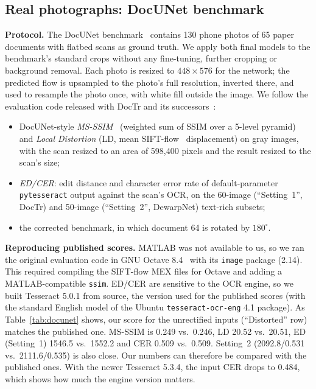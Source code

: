 \documentclass[a4paper,fleqn]{cas-sc}
\begin{document}
\subsection{Real photographs: DocUNet benchmark}
\label{sec:docunet}
\textbf{Protocol.} The DocUNet benchmark~\cite{ma2018docunet} contains 130 phone photos of 65 paper documents with flatbed scans as ground truth. We apply both final models to the benchmark's standard crops without any fine-tuning, further cropping or background removal. Each photo is resized to $448\times576$ for the network; the predicted flow is upsampled to the photo's full resolution, inverted there, and used to resample the photo once, with white fill outside the image. We follow the evaluation code released with DocTr and its successors~\cite{feng2021doctr,feng2022docgeonet,feng2025docscanner,feng2024doctrpp}:
\begin{itemize}
\item DocUNet-style \emph{MS-SSIM}~\cite{ma2018docunet,wang2003msssim} (weighted sum of SSIM over a 5-level pyramid) and \emph{Local Distortion} (LD, mean SIFT-flow~\cite{liu2011siftflow} displacement) on gray images, with the scan resized to an area of 598{,}400 pixels and the result resized to the scan's size;
\item \emph{ED/CER}: edit distance and character error rate of default-parameter \texttt{pytesseract} output against the scan's OCR, on the 60-image (``Setting~1'', DocTr) and 50-image (``Setting~2'', DewarpNet) text-rich subsets;
\item the corrected benchmark, in which document 64 is rotated by $180^\circ$.
\end{itemize}

\textbf{Reproducing published scores.} MATLAB was not available to us, so we ran the original evaluation code in GNU Octave 8.4~\cite{eaton2023octave} with its \texttt{image} package (2.14). This required compiling the SIFT-flow MEX files for Octave and adding a MATLAB-compatible \texttt{ssim}. ED/CER are sensitive to the OCR engine, so we built Tesseract 5.0.1 from source, the version used for the published scores (with the standard English model of the Ubuntu \texttt{tesseract-ocr-eng} 4.1 package). As Table~\ref{tab:docunet} shows, our score for the unrectified inputs (``Distorted'' row) matches the published one. MS-SSIM is 0.249 vs.\ 0.246, LD 20.52 vs.\ 20.51, ED (Setting~1) 1546.5 vs.\ 1552.2 and CER 0.509 vs.\ 0.509. Setting~2 (2092.8/0.531 vs.\ 2111.6/0.535) is also close. Our numbers can therefore be compared with the published ones. With the newer Tesseract 5.3.4, the input CER drops to 0.484, which shows how much the engine version matters.
\end{document}
